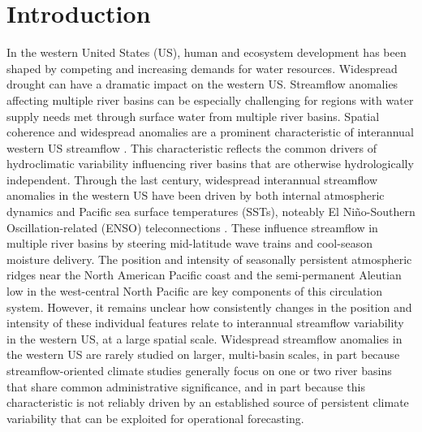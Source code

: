 \documentclass[final, double]{ua-thesis}
\begin{document}
\section{Introduction}

In the western United States (US), human and ecosystem development has been shaped by competing and increasing demands for water resources. Widespread drought can have a dramatic impact on the western US. Streamflow anomalies affecting multiple river basins can be especially challenging for regions with water supply needs met through surface water from multiple river basins.  Spatial coherence and widespread anomalies are a prominent characteristic  of interannual western US streamflow \citep{2cayan_influence_1989, 2lins_regional_1997}. This characteristic reflects the common drivers of hydroclimatic variability influencing river basins that are otherwise hydrologically independent. Through the last century, widespread interannual streamflow anomalies in the western US have been driven by both internal atmospheric dynamics and Pacific sea surface temperatures (SSTs), noteably El Ni\~{n}o-Southern Oscillation-related (ENSO) teleconnections \citep{2cayan_influence_1989, 2redmond_surface_1991, 2cayan_enso_1999}. These influence streamflow in multiple river basins by steering mid-latitude wave trains and cool-season moisture delivery. The position and intensity of seasonally persistent atmospheric ridges near the North American Pacific coast and the semi-permanent Aleutian low in the west-central North Pacific are key components of this circulation system. However, it remains unclear how consistently changes in the position and intensity of these individual features relate to interannual streamflow variability in the western US, at a large spatial scale. Widespread streamflow anomalies in the western US are rarely studied on larger, multi-basin scales, in part because streamflow-oriented climate studies generally focus on one or two river basins that share common administrative significance, and in part because this characteristic is not reliably driven by an established source of persistent climate variability that can be exploited for operational forecasting.
\end{document}
